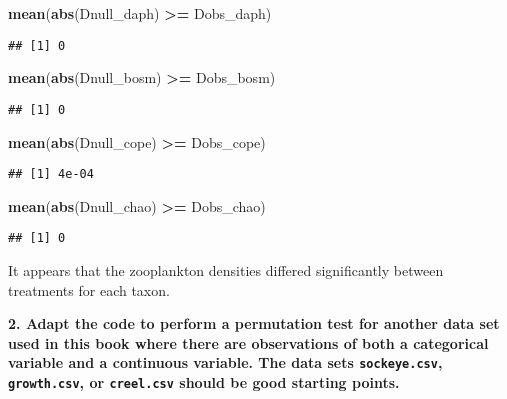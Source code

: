 \documentclass[]{book}
\newenvironment{Shaded}{\begin{snugshade}}{\end{snugshade}}
\newcommand{\KeywordTok}[1]{\textcolor[rgb]{0.13,0.29,0.53}{\textbf{#1}}}
\newcommand{\StringTok}[1]{\textcolor[rgb]{0.31,0.60,0.02}{#1}}
\newcommand{\OperatorTok}[1]{\textcolor[rgb]{0.81,0.36,0.00}{\textbf{#1}}}
\newcommand{\NormalTok}[1]{#1}
\theoremstyle{definition}
\theoremstyle{definition}
\theoremstyle{definition}
\theoremstyle{remark}
\begin{document}
\begin{Shaded}
\begin{Highlighting}[]
\KeywordTok{mean}\NormalTok{(}\KeywordTok{abs}\NormalTok{(Dnull_daph) }\OperatorTok{>=}\StringTok{ }\NormalTok{Dobs_daph)}
\end{Highlighting}
\end{Shaded}

\begin{verbatim}
## [1] 0
\end{verbatim}

\begin{Shaded}
\begin{Highlighting}[]
\KeywordTok{mean}\NormalTok{(}\KeywordTok{abs}\NormalTok{(Dnull_bosm) }\OperatorTok{>=}\StringTok{ }\NormalTok{Dobs_bosm)}
\end{Highlighting}
\end{Shaded}

\begin{verbatim}
## [1] 0
\end{verbatim}

\begin{Shaded}
\begin{Highlighting}[]
\KeywordTok{mean}\NormalTok{(}\KeywordTok{abs}\NormalTok{(Dnull_cope) }\OperatorTok{>=}\StringTok{ }\NormalTok{Dobs_cope)}
\end{Highlighting}
\end{Shaded}

\begin{verbatim}
## [1] 4e-04
\end{verbatim}

\begin{Shaded}
\begin{Highlighting}[]
\KeywordTok{mean}\NormalTok{(}\KeywordTok{abs}\NormalTok{(Dnull_chao) }\OperatorTok{>=}\StringTok{ }\NormalTok{Dobs_chao)}
\end{Highlighting}
\end{Shaded}

\begin{verbatim}
## [1] 0
\end{verbatim}

It appears that the zooplankton densities differed significantly between
treatments for each taxon.

\textbf{2. Adapt the code to perform a permutation test for another data
set used in this book where there are observations of both a categorical
variable and a continuous variable. The data sets \texttt{sockeye.csv},
\texttt{growth.csv}, or \texttt{creel.csv} should be good starting
points.}
\end{document}
